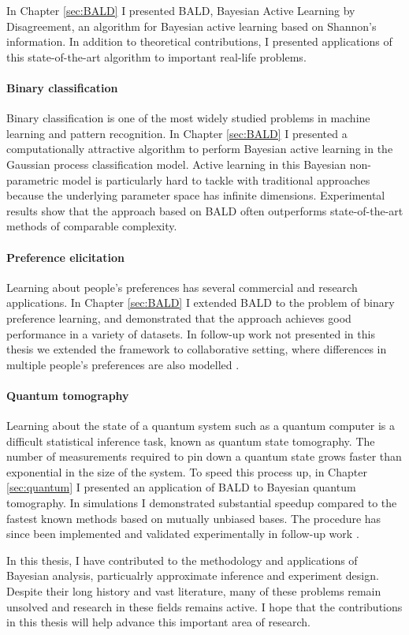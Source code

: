 In Chapter \ref{sec:BALD} I presented BALD, Bayesian Active Learning by Disagreement, an algorithm for Bayesian active learning based on Shannon's information. In addition to theoretical contributions, I presented applications of this state-of-the-art algorithm to important real-life problems.

\paragraph{Binary classification} Binary classification is one of the most widely studied problems in machine learning and pattern recognition. In Chapter \ref{sec:BALD} I presented a computationally attractive algorithm to perform Bayesian active learning in the Gaussian process classification model. Active learning in this Bayesian non-parametric model is particularly hard to tackle with traditional approaches because the underlying parameter space has infinite dimensions. Experimental results show that the approach based on BALD often outperforms state-of-the-art methods of comparable complexity.

\paragraph{Preference elicitation} Learning about people's preferences has several commercial and research applications. In Chapter \ref{sec:BALD} I extended BALD to the problem of binary preference learning, and demonstrated that the approach achieves good performance in a variety of datasets. In follow-up work not presented in this thesis we extended the framework to collaborative setting, where differences in multiple people's preferences are also modelled \citep{Houlsby2012preference}.

\paragraph{Quantum tomography} Learning about the state of a quantum system such as a quantum computer is a difficult statistical inference task, known as quantum state tomography. The number of measurements required to pin down a quantum state grows faster than exponential in the size of the system. To speed this process up, in Chapter \ref{sec:quantum} I presented an application of BALD to Bayesian quantum tomography. In simulations I demonstrated substantial speedup compared to the fastest known methods based on mutually unbiased bases. The procedure has since been implemented and validated experimentally in follow-up work \citep{Kravrsov13PRA}.

In this thesis, I have contributed to the methodology and applications of Bayesian analysis, particualrly approximate inference and experiment design. Despite their long history and vast literature, many of these problems remain unsolved and research in these fields remains active. I hope that the contributions in this thesis will help advance this important area of research.